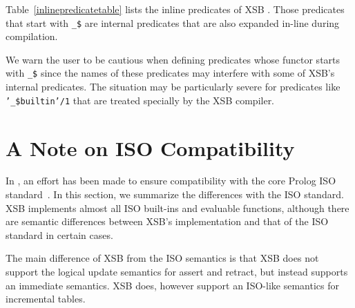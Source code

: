 Table~\ref{inlinepredicatetable} lists the inline predicates of
XSB \version.  Those predicates that start with \verb|_$|
are internal predicates that are also expanded in-line during
compilation.

\begin{table}[htbp]
\caption{The Inline Predicates of XSB}\label{inlinepredicatetable}
\end{table}

We warn the user to be cautious when defining predicates whose functor
starts with {\tt \_\$} since the names of these predicates may
interfere with some of XSB's internal predicates.  The situation may
be particularly severe for predicates like {\tt '\_\$builtin'/1} that
are treated specially by the XSB compiler.

\section{A Note on ISO Compatibility} \label{sec:iso}

In \version, an effort has been made to ensure compatibility with the
core Prolog ISO standard~\cite{ISO-Prolog}.  In this section, we
summarize the differences with the ISO standard.  XSB implements
almost all ISO built-ins and evaluable functions, although there are
semantic differences between XSB's implementation and that of the ISO
standard in certain cases.

The main difference of XSB from the ISO semantics is that XSB does not
support the logical update semantics for assert and retract, but
instead supports an immediate semantics.  XSB does, however support an
ISO-like semantics for incremental tables.


